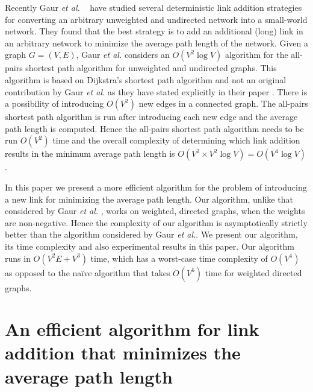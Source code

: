 \documentclass[journal,final,twocolumn,10pt,twoside]{IEEEtranTCOM}
\begin{document}
Recently Gaur {\em et al.} ~\cite{GCM} have studied several deterministic link addition strategies 
for converting an arbitrary unweighted and undirected network into a small-world network. They found that 
the best strategy is  
to add an additional (long) link in an arbitrary network to minimize 
the average path length of the network. 
Given a graph $G=(V,E)$, 
Gaur {\em et al.} \cite{GCM} considers an $O(V^2\log V)$ algorithm for the all-pairs 
shortest path algorithm for unweighted and undirected graphs. This algorithm is based 
on Dijkstra's shortest path algorithm and not an original contribution by Gaur {\em et al.} as 
they have stated explicitly in their paper \cite{GCM}. 
There is a possibility of introducing 
$O(V^2)$ new edges in a connected graph. The all-pairs shortest path 
algorithm is run after introducing each new edge and the average path length is computed. 
Hence the all-pairs shortest path algorithm needs to be run $O(V^2)$ time and the overall 
complexity of determining which link addition results in the minimum average path length is 
$O(V^2\times V^2\log V)=O(V^4\log V)$. 

In this paper we present a more efficient algorithm for the problem of introducing a new link 
for minimizing the average path length. Our algorithm, unlike that considered by 
Gaur {\em et al.} \cite{GCM}, works on weighted, directed graphs, when the weights 
are non-negative. Hence the complexity of our algorithm is asymptotically strictly better than 
the algorithm considered by Gaur {\em et al.}\cite{GCM}. We present our algorithm, its time complexity and also 
experimental results in this paper. Our algorithm runs in $O(V^2E+V^3)$ time, which has a 
worst-case time complexity of $O(V^4)$ as opposed to the na\"ive algorithm that takes $O(V^5)$
time for weighted directed graphs.   

\section{An efficient algorithm for link addition that minimizes the average path length}
\end{document}

